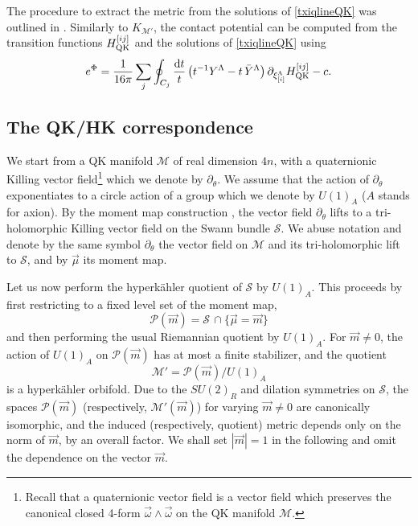 \documentclass[12pt,reqno]{article}
\numberwithin{equation}{section}
\newcommand{\be}{\begin{equation}}
\newcommand{\ee}{\end{equation}}
\def\({\left(}
\def\){\right)}
\def\p{\partial}
\def\bY{ \bar Y }
\newcommand{\de}{\mathrm{d}}
\newcommand{\cS}{\mathcal{S}}
\newcommand{\cM}{\mathcal{M}}
\newcommand{\cP}{\mathcal{P}}
\def\qHij#1{H^{[#1]}_{\rm QK}}
\def\xii#1{\xi_{[#1]}}
\newcommand{\hk}{{hyperk\"ahler}\xspace}
\def\varpiqk{t}
\def\sigp{{\theta}}
\def\pcM{\cM'}
\numberwithin{equation}{section}
\begin{document}
The procedure to extract the metric from the solutions of \eqref{txiqlineQK} was outlined
in \cite{Alexandrov:2008nk,Alexandrov:2008gh}.
Similarly to $K_{\pcM}$, the contact potential can be computed from the transition
functions $\qHij{ij}$ and the solutions of  \eqref{txiqlineQK} using
\be
e^{\Phi}=\frac{1}{16\pi} \sum_j\oint_{C_j}\frac{\de\varpiqk}{\varpiqk}
\(\varpiqk^{-1} Y^{\Lambda}-\varpiqk \, \bY^{\Lambda} \)
\p_{\xii{i}^\Lambda } \qHij{ij}
-c.
\label{contpotconst}
\ee




\subsection{The QK/HK correspondence}
\label{quotient}


We start from a QK manifold $\cM$ of real dimension $4n$, with a quaternionic Killing vector
field\footnote{Recall that a quaternionic  vector field is a vector field which preserves
the canonical closed 4-form $\vec \omega \wedge \vec \omega$ on the QK manifold $\cM$.}
 which we denote by $\partial_{\sigp}$. We assume that the action of $\partial_{\sigp}$
exponentiates to a circle action of a group which we denote by $U(1)_A$ ($A$ stands
for axion). By the moment map construction \cite{MR872143,MR960830}, the vector
field $\partial_\sigp$ lifts to a tri-holomorphic Killing vector field on the Swann
bundle $\cS$.
We abuse notation and denote by the same symbol $\partial_\sigp$ the vector
field on $\cM$ and its tri-holomorphic lift to $\cS$, and by
$\vec \mu$ its moment map.

Let us now perform the \hk quotient of $\cS$ by $U(1)_A$.
This proceeds by first restricting to a fixed level set of
the moment map,
\be
\label{defPm}
\cP(\vec m) = \cS\, \cap\{\vec\mu=\vec m \}
\ee
and then performing the usual Riemannian quotient by $U(1)_A$. For $\vec m\neq 0$,
the action of $U(1)_A$ on $\cP(\vec m)$ has at most a finite stabilizer, and the quotient
\be
\pcM = \cP(\vec m) / U(1)_A
\ee
is a \hk orbifold. Due to the $SU(2)_R$ and dilation symmetries on $\cS$,
the spaces $\cP(\vec m)$ (respectively, $\pcM(\vec m)$) for varying $\vec m\neq 0$ are canonically
isomorphic, and the induced (respectively, quotient)
metric depends only on the norm of $\vec m$, by an overall factor.
We shall set  $|\vec m|=1$ in the following and omit the dependence on the vector $\vec m$.
\end{document}
